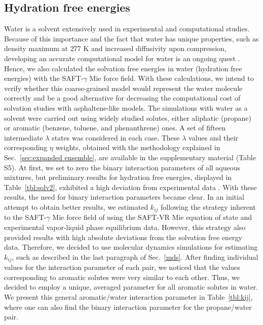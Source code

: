 \documentclass[preprint]{elsarticle}
\begin{document}
	\subsection{Hydration free energies}
	
	Water is a solvent extensively used in experimental and computational studies.
	Because of this importance and the fact that water has unique properties, such as density maximum at 277 K and increased diffusivity upon compression, developing an accurate computational model for water is an ongoing quest \cite{hadley2012}.
	Hence, we also calculated the solvation free energies in water (hydration free energies) with the SAFT-$\gamma$ Mie force field.
	With these calculations, we intend to verify whether this coarse-grained model would represent the water molecule correctly and be a good alternative for decreasing the computational cost of solvation studies with asphaltene-like models.
	The simulations with water as a solvent were carried out using widely studied solutes, either aliphatic (propane) or aromatic (benzene, toluene, and phenanthrene) ones.
	A set of fifteen intermediate $\lambda$ states was considered in each case.
	These $\lambda$ values and their corresponding $\eta$ weights, obtained with the methodology explained in Sec.~\ref{sec:expanded ensemble}, are available in the supplementary material (Table S5).
	At first, we set to zero the binary interaction parameters of all aqueous mixtures, but preliminary results for hydration free energies, displayed in Table~\ref{tbl:solv2}, exhibited a high deviation from experimental data \cite{P29900000291, doi:10.1021/ct050097l}.
	With these results, the need for binary interaction parameters became clear.
	In an initial attempt to obtain better results, we estimated $k_{ij}$ following the strategy inherent to the SAFT-$\gamma$ Mie force field of using the SAFT-VR Mie equation of state and experimental vapor-liquid phase equilibrium data.
	However, this strategy also provided results with high absolute deviations from the solvation free energy data.
	Therefore, we decided to use molecular dynamics simulations for estimating $k_{ij}$, such as described in the last paragraph of Sec.~\ref{mds}.
	After finding individual values for the interaction parameter of each pair, we noticed that the values corresponding to aromatic solutes were very similar to each other.
	Thus, we decided to employ a unique, averaged parameter for all aromatic solutes in water.
	We present this general aromatic/water interaction parameter in Table~\ref{tbl:kij}, where one can also find the binary interaction parameter for the propane/water pair.
	
\end{document}
